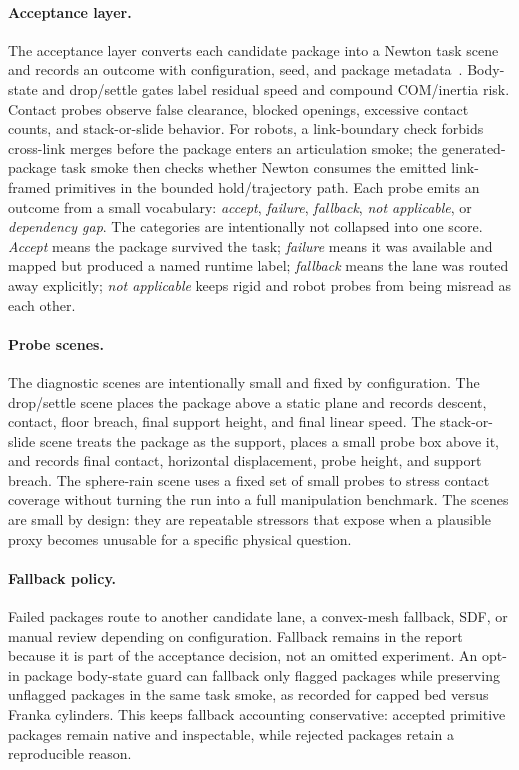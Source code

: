 \paragraph{Acceptance layer.}
The acceptance layer converts each candidate package into a Newton task scene and records an outcome with configuration, seed, and package metadata~\cite{newton2026}.
Body-state and drop/settle gates label residual speed and compound COM/inertia risk.
Contact probes observe false clearance, blocked openings, excessive contact counts, and stack-or-slide behavior.
For robots, a link-boundary check forbids cross-link merges before the package enters an articulation smoke; the generated-package task smoke then checks whether Newton consumes the emitted link-framed primitives in the bounded hold/trajectory path.
Each probe emits an outcome from a small vocabulary: \emph{accept}, \emph{failure},
\emph{fallback}, \emph{not applicable}, or \emph{dependency gap}.
The categories are intentionally not collapsed into one score.
\emph{Accept} means the package survived the task; \emph{failure} means it was available and mapped but produced a named runtime label; \emph{fallback} means the lane was routed away explicitly; \emph{not applicable} keeps rigid and robot probes from being misread as each other.

\paragraph{Probe scenes.}
The diagnostic scenes are intentionally small and fixed by configuration.
The drop/settle scene places the package above a static plane and records descent, contact,
floor breach, final support height, and final linear speed.
The stack-or-slide scene treats the package as the support, places a small probe box above it, and
records final contact, horizontal displacement, probe height, and support breach.
The sphere-rain scene uses a fixed set of small probes to stress contact coverage without turning
the run into a full manipulation benchmark.
The scenes are small by design: they are repeatable stressors that expose when a plausible proxy becomes unusable for a specific physical question.

\paragraph{Fallback policy.}
Failed packages route to another candidate lane, a convex-mesh fallback, SDF, or manual review depending on configuration.
Fallback remains in the report because it is part of the acceptance decision, not an omitted experiment.
An opt-in package body-state guard can fallback only flagged packages while preserving unflagged packages in the same task smoke, as recorded for capped bed versus Franka cylinders.
This keeps fallback accounting conservative: accepted primitive packages remain native and inspectable, while rejected packages retain a reproducible reason.

